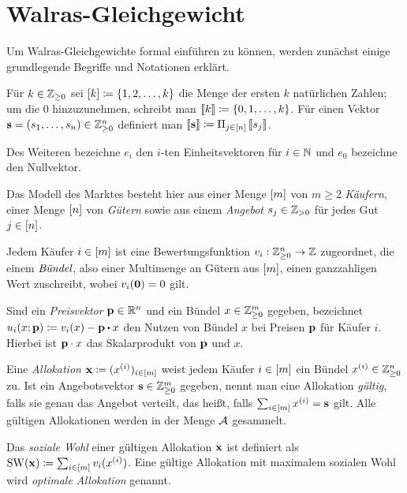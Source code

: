 \section{Walras-Gleichgewicht}

Um Walras-Gleichgewichte formal einführen zu können, werden zunächst einige grundlegende Begriffe und Notationen erklärt.

\begin{notation}
	Für $k\in\mathbb{Z}_{\geq 0}$ sei $\left[ k \right]\coloneqq \{ 1, 2, \dots, k \}$ die Menge der ersten $k$ natürlichen Zahlen; um die $0$ hinzuzunehmen, schreibt man $\left\llbracket k \right\rrbracket\coloneqq \{0,1,\dots, k \}$.
	Für einen Vektor $\mathbf{s} = (s_1, \dots, s_n)\in\mathbb{Z}_{\geq0}^n$ definiert man $\left\llbracket \mathbf{s} \right\rrbracket\coloneqq \Pi_{j\in\left[ n \right]} \left\llbracket s_j \right\rrbracket$.
	
	Des Weiteren bezeichne $e_i$ den $i$-ten Einheitsvektoren für $i\in\mathbb{N}$ und $e_0$ bezeichne den Nullvektor. 
\end{notation}

Das Modell des Marktes besteht hier aus einer Menge $\left[ m \right]$ von $m\geq 2$ \emph{Käufern}, einer Menge $\left[ n \right]$ von \emph{Gütern} sowie aus einem \emph{Angebot} $s_j\in\mathbb{Z}_{>0}$ für jedes Gut $j\in\left[ n \right]$.

Jedem Käufer $i\in\left[ m \right]$ ist eine Bewertungsfunktion $v_i:\mathbb{Z}^n_{\geq 0} \rightarrow \mathbb{Z}$ zugeordnet, die einem $\emph{Bündel}$, also einer Multimenge an Gütern aus $\left[ m \right]$, einen ganzzahligen Wert zuschreibt, wobei $v_i(\mathbf{0}) = 0$ gilt.

Sind ein \emph{Preisvektor} $\mathbf{p}\in\mathbb{R}^n$ und ein Bündel $x\in\mathbb{Z}^{m}_{\geq0}$ gegeben, bezeichnet $u_i(x;\fp) \coloneqq v_i(x) - \fp \bcdot x$ den Nutzen von Bündel $x$ bei Preisen $\mathbf{p}$ für Käufer $i$.
Hierbei ist $\mathbf{p} \cdot x$ das Skalarprodukt von $\mathbf{p}$ und $x$.

\begin{definition}[Allokation]
	Eine \emph{Allokation} $\mathbf{x}\coloneqq (x^{(i)})_{i\in\left[ m \right]}$ weist jedem Käufer $i\in\left[ m \right]$ ein Bündel $x^{(i)} \in\mathbb{Z}^n_{\geq0}$ zu.
	Ist ein Angebotsvektor $\mathbf{s}\in\mathbb{Z}^m_{\geq0}$ gegeben, nennt man eine Allokation \emph{gültig}, falls sie genau das Angebot verteilt, das heißt, falls $\sum_{i\in\left[ m \right]} x^{(i)} = \mathbf{s}$ gilt.
	Alle gültigen Allokationen werden in der Menge $\operatorname{\mathcal{A}}$ gesammelt.
	
	Das \emph{soziale Wohl} einer gültigen Allokation $\mathbf{x}$ ist definiert als $\operatorname{SW}(\mathbf{x}) \coloneqq \sum_{i\in\left[ m \right]} v_i(x^{(i)})$.
	Eine gültige Allokation mit maximalem sozialen Wohl wird \emph{optimale Allokation} genannt.
\end{definition}


